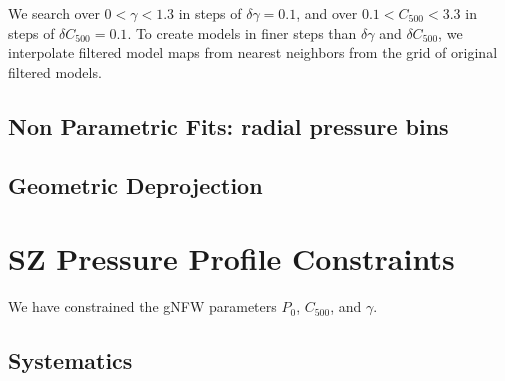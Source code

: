 \documentclass[iop,numberedappendix,apj]{emulateapj}
\begin{document}
We search over $0 < \gamma < 1.3$ in steps of $\delta \gamma = 0.1$, and over
$0.1 < C_{500} < 3.3$ in steps of $\delta C_{500} = 0.1$. To create models in finer steps than $\delta \gamma$ 
and $\delta C_{500}$, we interpolate filtered model maps from nearest neighbors from the grid of original 
filtered models. 

\subsection{Non Parametric Fits: radial pressure bins}

\subsection{Geometric Deprojection}

\section{SZ Pressure Profile Constraints}
\label{sec:pp_constraints}

We have constrained the gNFW parameters $P_0$, $C_{500}$, and $\gamma$.


\subsection{Systematics}
\label{sec:systematics}


\end{document}
